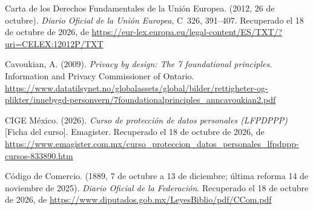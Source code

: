 \documentclass[12pt, a4paper]{article}
\begin{document}
\begin{list}{}{\setlength{\leftmargin}{1.27cm}\setlength{\itemindent}{-1.27cm}%
  \setlength{\labelwidth}{0pt}\setlength{\labelsep}{0pt}\setlength{\itemsep}{6pt}}

\item Carta de los Derechos Fundamentales de la Unión Europea.
  (2012, 26 de octubre). \textit{Diario Oficial de la Unión
  Europea}, C~326, 391--407. Recuperado el 18 de octubre de 2026, de \url{https://eur-lex.europa.eu/legal-content/ES/TXT/?uri=CELEX:12012P/TXT}
 

\item Cavoukian, A. (2009). \textit{Privacy by design: The 7
  foundational principles}. Information and Privacy Commissioner
  of Ontario.
  \url{https://www.datatilsynet.no/globalassets/global/bilder/rettigheter-og-plikter/innebygd-personvern/7foundationalprinciples_anncavoukian2.pdf}


\item CIGE México. (2026). \textit{Curso de protección de datos
  personales (LFPDPPP)} [Ficha del curso]. Emagister.
  Recuperado el 18 de octubre de 2026, de \url{https://www.emagister.com.mx/curso_proteccion_datos_personales_lfpdppp-cursos-833890.htm}
 
 
\item Código de Comercio. (1889, 7 de octubre a 13 de diciembre;
  última reforma 14 de noviembre de 2025). \textit{Diario Oficial de
  la Federación}. Recuperado el 18 de octubre de 2026, de \url{https://www.diputados.gob.mx/LeyesBiblio/pdf/CCom.pdf}
 

\end{list}
\end{document}
